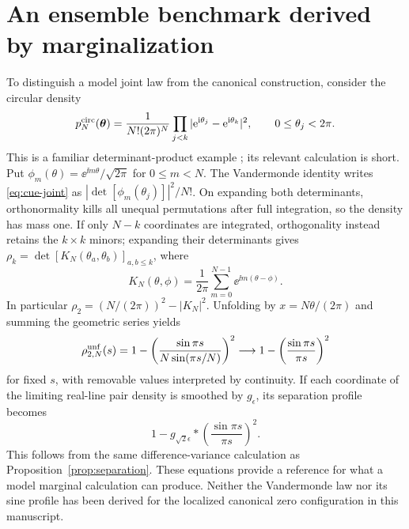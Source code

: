 \section{An ensemble benchmark derived by marginalization}\label{app:ensemble}

To distinguish a model joint law from the canonical construction,
consider the circular density
\begin{equation}\label{eq:cue-joint}
 p_N^{\rm circ}(\boldsymbol\theta)
   =\frac1{N!(2\pi)^N}
      \prod_{j<k}|\mathrm e^{\mathrm i\theta_j}-\mathrm e^{\mathrm i\theta_k}|^2,
 \qquad 0\le\theta_j<2\pi.
\end{equation}
This is a familiar determinant-product example
\cite[Section 4]{Borodin2009DPP}; its relevant calculation is short.
Put $\phi_m(\theta)=\ee^{\ii m\theta}/\sqrt{2\pi}$ for $0\le m<N$.
The Vandermonde identity writes \eqref{eq:cue-joint} as
$|\det[\phi_m(\theta_j)]|^2/N!$. On expanding both determinants,
orthonormality kills all unequal permutations after full integration,
so the density has mass one. If only $N-k$ coordinates are integrated,
orthogonality instead retains the $k\times k$ minors; expanding their
determinants gives
$\rho_k=\det[K_N(\theta_a,\theta_b)]_{a,b\le k}$, where
\[
 K_N(\theta,\phi)=\frac1{2\pi}\sum_{m=0}^{N-1}
                                      \ee^{\ii m(\theta-\phi)}.
\]
In particular $\rho_2=(N/(2\pi))^2-|K_N|^2$.
Unfolding by $x=N\theta/(2\pi)$ and summing the geometric series yields
\begin{equation}\label{eq:cue-sine}
 \rho_{2,N}^{\rm unf}(s)
    =1-\left(\frac{\sin\pi s}{N\sin(\pi s/N)}\right)^2
       \longrightarrow 1-\left(\frac{\sin\pi s}{\pi s}\right)^2
\end{equation}
for fixed $s$, with removable values interpreted by continuity.
If each coordinate of the limiting real-line pair density is smoothed
by $g_\epsilon$, its separation profile becomes
\begin{equation}\label{eq:smoothed-sine-reference}
 1-g_{\sqrt2\epsilon}*\left(\frac{\sin\pi s}{\pi s}\right)^2.
\end{equation}
This follows from the same difference-variance calculation as
Proposition~\ref{prop:separation}. These equations provide a reference
for what a model marginal calculation can produce. Neither the
Vandermonde law nor its sine profile has been derived for the localized
canonical zero configuration in this manuscript.
